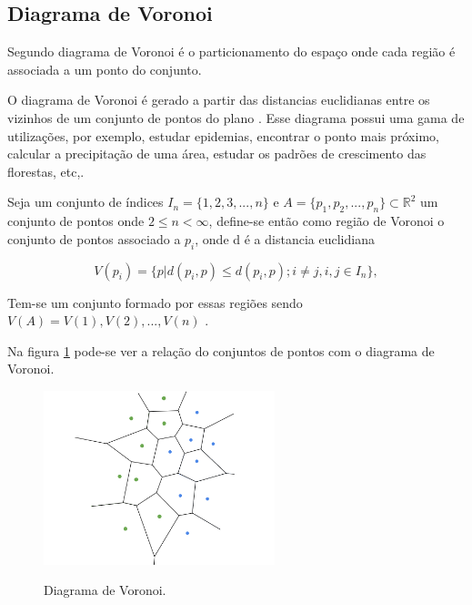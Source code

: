 \subsection{Diagrama de Voronoi}

Segundo  diagrama de Voronoi é o particionamento do espaço onde cada região é associada a um ponto do conjunto.

O diagrama de Voronoi é gerado a partir das distancias euclidianas entre os vizinhos de um conjunto de pontos do plano\space
\cite{diagrama_de_voronoi:_uma_exploracao_nas_distancias_euclidiana_e_do_taxi}. Esse diagrama possui uma gama de utilizações, por exemplo, estudar epidemias, encontrar o 
ponto mais próximo, calcular a precipitação de uma área, estudar os padrões de crescimento das florestas, etc,\space\cite{poligonos_de_thiessen_ou_voronoi}. 

Seja um conjunto de índices $I_n = \{1, 2, 3, ..., n\}$ e $A = \{p_1, p_2, ..., p_n\} \subset \mathbb{R}^2$ um conjunto de pontos onde $2 \leq n < \infty$, define-se então como região de Voronoi o conjunto de pontos associado a $p_i$, onde d é a distancia euclidiana

\begin{equation}
	V(p_i) = \{p|d(p_i,p) \leq d(p_i,p);i \neq j, i, j \in I_n\},
\end{equation}

Tem-se um conjunto formado por essas regiões sendo $V(A) = {V(1), V(2), ..., V(n)}$ \cite{rodrigues_diagrama_2019}.

Na figura \cref{fig:diagrama_voronoi} pode-se ver a relação do conjuntos de pontos com o diagrama de Voronoi.

\begin{figure}[ht]
	\centering
	\caption{Diagrama de Voronoi.}
	\includegraphics[width=0.6\textwidth]{figures/diagrama_de_voronoi.png}
	\label{fig:diagrama_voronoi}
\end{figure}
